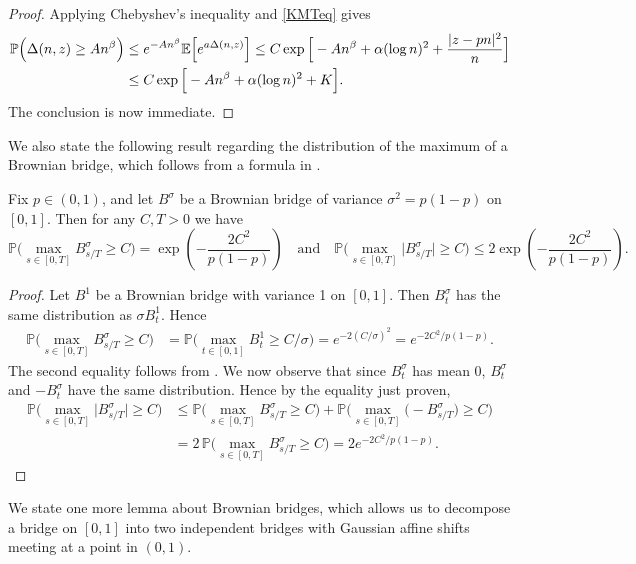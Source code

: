 \begin{proof}
	Applying Chebyshev's inequality and \eqref{KMTeq} gives
	\begin{align*}
	\mathbb{P}\Big(\Delta(n,z) \geq An^\beta\Big) &\leq e^{-An^\beta}\mathbb{E}\Big[e^{a\Delta(n,z)}\Big] \leq C\exp\Big[-An^\beta + \alpha(\log n)^2 + \frac{|z-pn|^2}{n}\Big]\\
	&\leq C\exp\Big[-An^\beta + \alpha(\log n)^2 + K\Big].
	\end{align*}
	The conclusion is now immediate.
\end{proof}

We also state the following result regarding the distribution of the maximum of a Brownian bridge, which follows from a formula in \cite[Chapter 4]{KS}.

\begin{lemma}\label{BBmax}
	Fix $p\in (0,1)$, and let $B^\sigma$ be a Brownian bridge of variance $\sigma^2 = p(1-p)$ on $[0,1]$. Then for any $C,T> 0$ we have
	\[
	\mathbb{P}\Big(\max_{s\in[0,T]} B^\sigma_{s/T} \geq C\Big) = \exp\left( - \frac{2C^2}{p(1-p)}\right) \quad \mathrm{and} \quad \mathbb{P}\Big(\max_{s\in[0,T]} \big|B^\sigma_{s/T}\big| \geq C\Big) \leq 2\exp\left( - \frac{2C^2}{p(1-p)}\right).
	\]
\end{lemma}

\begin{proof}
	Let $B^1$ be a Brownian bridge with variance 1 on $[0,1]$. Then $B^\sigma_t$ has the same distribution as $\sigma B^1_t$. Hence
	\begin{align*}
	\mathbb{P}\Big( \max_{s\in[0,T]} B^\sigma_{s/T} \geq C \Big) &= \mathbb{P}\Big( \max_{t\in[0,1]} B^1_t \geq C/\sigma \Big) = e^{-2(C/\sigma)^2} = e^{-2C^2/p(1-p)}.
	\end{align*}
	The second equality follows from \cite[Chapter 4, (3.40)]{KS}. We now observe that since $B^\sigma_t$ has mean 0, $B^\sigma_t$ and $-B^\sigma_t$ have the same distribution. Hence by the equality just proven,
	\begin{align*}
	\mathbb{P}\Big( \max_{s\in[0,T]} \big| B^\sigma_{s/T}\big| \geq C \Big) &\leq \mathbb{P}\Big( \max_{s\in[0,T]}  B^\sigma_{s/T} \geq C \Big) + \mathbb{P}\Big( \max_{s\in[0,T]}  \big(-B^\sigma_{s/T}\big) \geq C \Big)\\
	&= 2\,\mathbb{P}\Big( \max_{s\in[0,T]}  B^\sigma_{s/T} \geq C \Big) = 2e^{-2C^2/p(1-p)}.
	\end{align*}
\end{proof}

We state one more lemma about Brownian bridges, which allows us to decompose a bridge on $[0,1]$ into two independent bridges with Gaussian affine shifts meeting at a point in $(0,1)$.

